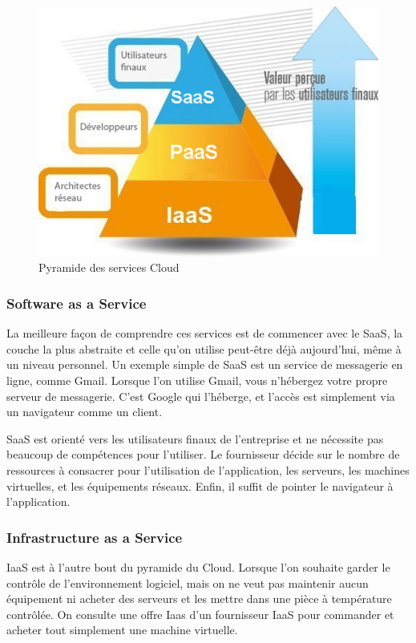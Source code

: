 \begin{onehalfspace}
\begin{figure}[H]
\centering
\includegraphics [scale=0.7]{chapitre2/assets/pyramide}
\caption{Pyramide des services Cloud}
\end{figure}

\subsubsection*{Software as a Service}

La meilleure façon de comprendre ces services est de commencer avec le SaaS, la couche la plus abstraite et celle qu'on utilise peut-être déjà aujourd'hui, même à un niveau personnel. Un exemple simple de SaaS est un service de messagerie en ligne, comme Gmail. Lorsque l'on utilise Gmail, vous n'hébergez votre propre serveur de messagerie. C'est Google qui l'héberge, et l'accès est simplement via un navigateur comme un client.

SaaS est orienté vers les utilisateurs finaux de l'entreprise et ne nécessite pas beaucoup de compétences pour l'utiliser. Le fournisseur décide sur le nombre de ressources à consacrer pour l'utilisation de l'application, les serveurs, les machines virtuelles, et les équipements réseaux. Enfin, il suffit de pointer le navigateur à l'application.

\subsubsection*{Infrastructure as a Service}

IaaS est à l'autre bout du pyramide du Cloud. Lorsque l'on souhaite garder le contrôle de l'environnement logiciel, mais on ne veut pas maintenir aucun équipement ni acheter des serveurs et les mettre dans une pièce à température contrôlée. On consulte une offre Iaas d'un fournisseur IaaS pour commander et acheter tout simplement une machine virtuelle.


\end{onehalfspace}
